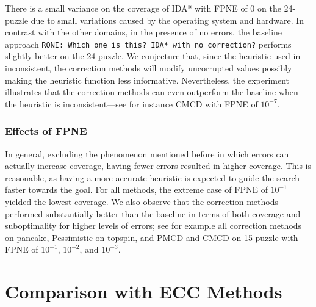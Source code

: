 \documentclass{article}
\newcommand{\roni}[1]{\mbox{\tt RONI: #1}}
\begin{document}
There is a small variance on the coverage of IDA* with FPNE of $0$ on the 24-puzzle due to small variations caused by the operating system and hardware.
In contrast with the other domains, in the presence of no errors, the baseline approach \roni{Which one is this? IDA* with no correction?} performs slightly better on the 24-puzzle. We conjecture that, since the heuristic used in inconsistent, the correction methods will modify uncorrupted values possibly making the heuristic function less informative. Nevertheless, the experiment illustrates that the correction methods can even outperform the baseline when the heuristic is inconsistent---see for instance CMCD with FPNE of $10^{-7}$. 

\subsubsection{Effects of FPNE} 
In general, excluding the phenomenon mentioned before in which errors can actually increase coverage, having fewer errors
resulted in higher coverage. This is reasonable, as having a more accurate heuristic is expected to guide the search faster towards the goal. For all methods, the extreme case of FPNE of $10^{-1}$ yielded the lowest coverage. We also observe that the correction methods performed substantially better than the baseline in terms of both coverage and suboptimality for higher levels of errors; see for example all correction methods on pancake, Pessimistic on topspin, and PMCD and CMCD on 15-puzzle with FPNE of $10^{-1}$, $10^{-2}$, and $10^{-3}$. 

\section{Comparison with ECC Methods}
\end{document}
